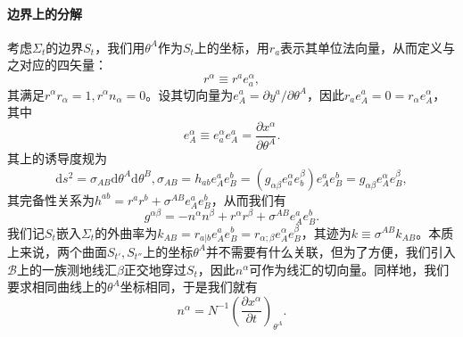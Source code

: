 \documentclass[hyperref, UTF8, a4paper]{ctexart}
\begin{document}
\paragraph{边界上的分解}
考虑$\Sigma _{t}$的边界$S_{t}$，我们用$\theta ^{A}$作为$S_{t}$上的坐标，用$r_{a}$表示其单位法向量，从而定义与之对应的四矢量：
\begin{equation*}
	r^{\alpha } \equiv r^{a} e_{a}^{\alpha } ,
\end{equation*}
其满足$r^{\alpha } r_{\alpha } =1,r^{\alpha } n_{\alpha } =0$。设其切向量为$e_{A}^{a} =\partial y^{a} /\partial \theta ^{A}$，因此$r_{a} e_{A}^{a} =0=r_{\alpha } e_{A}^{\alpha }$，其中
\begin{equation*}
	e_{A}^{\alpha } \equiv e_{a}^{\alpha } e_{A}^{a} =\frac{\partial x^{\alpha }}{\partial \theta ^{A}} .
\end{equation*}
其上的诱导度规为
\begin{equation*}
	\mathrm{d} s^{2} =\sigma _{AB}\mathrm{d} \theta ^{A}\mathrm{d} \theta ^{B} ,\sigma _{AB} =h_{ab} e_{A}^{a} e_{B}^{b} =(g_{\alpha \beta } e_{a}^{\alpha } e_{b}^{\beta } )e_{A}^{a} e_{B}^{b} =g_{\alpha \beta } e_{A}^{\alpha } e_{B}^{\beta } ,
\end{equation*}
其完备性关系为$h^{ab} =r^{a} r^{b} +\sigma ^{AB} e_{A}^{a} e_{B}^{b}$，从而我们有
\begin{equation*}
	g^{\alpha \beta } =-n^{\alpha } n^{\beta } +r^{\alpha } r^{\beta } +\sigma ^{AB} e_{A}^{a} e_{B}^{b} .
\end{equation*}
我们记$S_{t}$嵌入$\Sigma _{t}$的外曲率为$k_{AB} =r_{a|b} e_{A}^{a} e_{B}^{b} =r_{\alpha ;\beta } e_{A}^{\alpha } e_{B}^{\beta }$，其迹为$k\equiv \sigma ^{AB} k_{AB}$。本质上来说，两个曲面$S_{t'} ,S_{t''}$上的坐标$\theta ^{A}$并不需要有什么关联，但为了方便，我们引入$\mathscr{B}$上的一族测地线汇$\beta $正交地穿过$S_{t}$，因此$n^{\alpha }$可作为线汇的切向量。同样地，我们要求相同曲线上的$\theta ^{A}$坐标相同，于是我们就有
\begin{equation*}
	n^{\alpha } =N^{-1}\left(\frac{\partial x^{\alpha }}{\partial t}\right)_{\theta ^{A}} .
\end{equation*}
\end{document}
